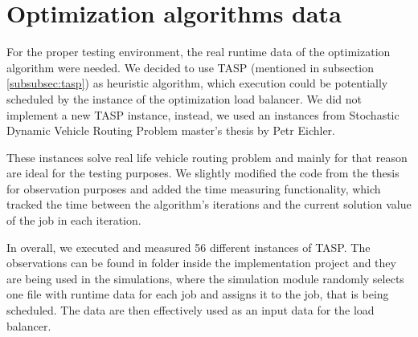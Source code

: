 \section{Optimization algorithms data}\label{sec:optimization-algorithms-data}
For the proper testing environment,
the real runtime data of the optimization algorithm were needed.
We decided to use TASP (mentioned in subsection \ref{subsubsec:tasp}) as heuristic algorithm,
which execution could be potentially scheduled by the instance of the optimization load balancer.
We did not implement a new TASP instance,
instead,
we used an instances from Stochastic Dynamic Vehicle Routing Problem master's thesis by Petr Eichler\cite{Eichler:Petr:2003}.

These instances solve real life vehicle routing problem 
and mainly for that reason are ideal for the testing purposes.
We slightly modified the code from the thesis for observation purposes
and added the time measuring functionality,
which tracked the time between the algorithm's iterations and the current solution value of the job in each iteration.

In overall,
we executed and measured 56 different instances of TASP.
The observations can be found in  folder inside the implementation project
and they are being used in the simulations,
where the simulation module randomly selects one file with runtime data for each job 
and assigns it to the job, that is being scheduled.
The data are then effectively used as an input data for the load balancer.